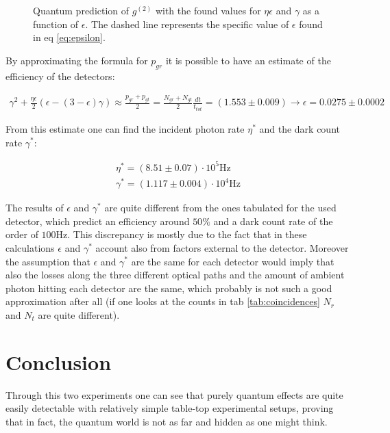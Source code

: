 \documentclass[a4paper, 11pt]{article}
\begin{document}
      \begin{figure}[H]
        \centering
        \caption{Quantum prediction of $g^{(2)}$ with the found values for $\eta\epsilon$ and $\gamma$ as a function of $\epsilon$. The dashed line represents the specific value of $\epsilon$ found in eq \ref{eq:epsilon}.}
        \label{fig:q_g2}
      \end{figure}

      By approximating the formula for $p_{gr}$ it is possible to have an estimate of the efficiency of the detectors:

      \begin{gather} \label{eq:epsilon}
        \gamma^2 + \frac{\eta\epsilon}{2}\left(\epsilon - (3 - \epsilon)\gamma \right) \approx \frac{p_{gr} + p_{gt}}{2} = \frac{N_{gr} + N_{gt}}{2}\frac{dt}{t_{tot}} = (1.553 \pm 0.009)
        \rightarrow \epsilon = 0.0275 \pm 0.0002
      \end{gather}

      From this estimate one can find the incident photon rate $\eta^*$ and the dark count rate $\gamma^*$:

      \begin{gather*}
        \eta^* = (8.51 \pm 0.07) \cdot 10^5 \si{\hertz} \\
        \gamma^* = (1.117 \pm 0.004) \cdot 10^4 \si{\hertz}
      \end{gather*}

      The results of $\epsilon$ and $\gamma^*$ are quite different from the ones tabulated for the used detector, which predict an efficiency around $50\%$ and a dark count rate of the order of $100 \si{\hertz}$. This discrepancy is mostly due to the fact that in these calculations $\epsilon$ and $\gamma^*$ account also from factors external to the detector. Moreover the assumption that $\epsilon$ and $\gamma^*$ are the same for each detector would imply that also the losses along the three different optical paths and the amount of ambient photon hitting each detector are the same, which probably is not such a good approximation after all (if one looks at the counts in tab \ref{tab:coincidences} $N_r$ and $N_t$ are quite different).

  \section*{Conclusion}
    Through this two experiments one can see that purely quantum effects are quite easily detectable with relatively simple table-top experimental setups, proving that in fact, the quantum world is not as far and hidden as one might think.
\end{document}
